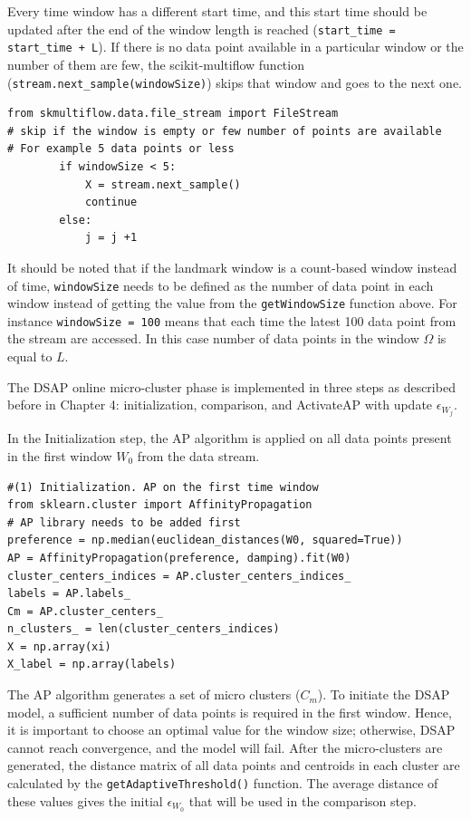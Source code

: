 Every time window has a different start time, and this start time should be updated after the end of the window length is reached (\texttt{start\_time = start\_time + L}). If there is no data point available in a particular window or the number of them are few, the scikit-multiflow function (\texttt{stream.next\_sample(windowSize)}) skips that window and goes to the next one.

\begin{lstlisting}
from skmultiflow.data.file_stream import FileStream
# skip if the window is empty or few number of points are available
# For example 5 data points or less 
        if windowSize < 5:
            X = stream.next_sample()
            continue
        else:    
            j = j +1
\end{lstlisting}


It should be noted that if the landmark window is a count-based window instead of time, \texttt{windowSize} needs to be defined as the number of data point in each window instead of getting the value from the \texttt{getWindowSize} function above. For instance \texttt{windowSize = 100} means that each time the latest 100 data point from the stream are accessed. In this case number of data points in the window $\Omega$ is equal to $L$.

The DSAP online micro-cluster phase is implemented in three steps as described before in Chapter 4: initialization, comparison, and ActivateAP with update $\epsilon_{W_j}$.

In the Initialization step, the AP algorithm is applied on all data points present in the first window $W_0$ from the data stream. %

\begin{lstlisting}
#(1) Initialization. AP on the first time window
from sklearn.cluster import AffinityPropagation 
# AP library needs to be added first
preference = np.median(euclidean_distances(W0, squared=True))
AP = AffinityPropagation(preference, damping).fit(W0)
cluster_centers_indices = AP.cluster_centers_indices_
labels = AP.labels_
Cm = AP.cluster_centers_
n_clusters_ = len(cluster_centers_indices)
X = np.array(xi)
X_label = np.array(labels)
\end{lstlisting}

The AP algorithm generates a set of micro clusters ($C{_m}$). To initiate the DSAP model, a sufficient number of data points is required in the first window. Hence, it is important to choose an optimal value for the window size; otherwise, DSAP cannot reach convergence, and the model will fail. After the micro-clusters are generated, the distance matrix of all data points and centroids in each cluster are calculated by the \texttt{getAdaptiveThreshold()} function. The average distance of these values gives the initial $\epsilon_{W_0}$ that will be used in the comparison step.


